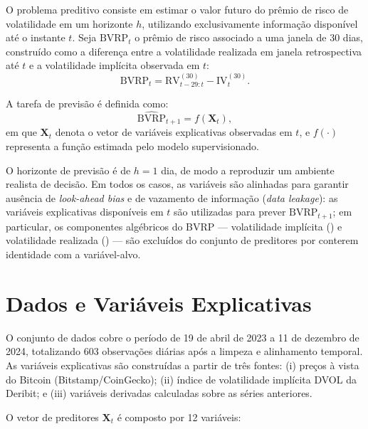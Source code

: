 O problema preditivo consiste em estimar o valor futuro do prêmio de risco de
volatilidade em um horizonte $h$, utilizando exclusivamente informação disponível
até o instante $t$. Seja $\text{BVRP}_t$ o prêmio de risco associado a uma janela
de 30 dias, construído como a diferença entre a volatilidade realizada em janela
retrospectiva até $t$ e a volatilidade implícita observada em $t$:
\begin{equation}
\text{BVRP}_{t} = \text{RV}_{t-29:t}^{(30)} - \text{IV}_{t}^{(30)}.
\end{equation}

A tarefa de previsão é definida como:
\begin{equation}
\widehat{\text{BVRP}}_{t+1} = f\left(\mathbf{X}_t\right),
\end{equation}
em que $\mathbf{X}_t$ denota o vetor de variáveis explicativas observadas em $t$,
e $f(\cdot)$ representa a função estimada pelo modelo supervisionado.

O horizonte de previsão é de $h=1$ dia, de modo a reproduzir um ambiente realista
de decisão. Em todos os casos, as variáveis são alinhadas para garantir ausência
de \textit{look-ahead bias} e de vazamento de informação (\textit{data leakage}):
as variáveis explicativas disponíveis em $t$ são utilizadas para prever
$\text{BVRP}_{t+1}$; em particular, os componentes algébricos do BVRP ---
volatilidade implícita () e volatilidade realizada () --- são
excluídos do conjunto de preditores por conterem identidade com a variável-alvo.

\section{Dados e Variáveis Explicativas}
\label{sec:cap8_dados}

O conjunto de dados cobre o período de 19 de abril de 2023 a 11 de dezembro de 2024,
totalizando 603 observações diárias após a limpeza e alinhamento temporal. As variáveis
explicativas são construídas a partir de três fontes: (i) preços à vista do Bitcoin
(Bitstamp/CoinGecko); (ii) índice de volatilidade implícita DVOL da Deribit; e
(iii) variáveis derivadas calculadas sobre as séries anteriores.

O vetor de preditores $\mathbf{X}_t$ é composto por 12 variáveis:

